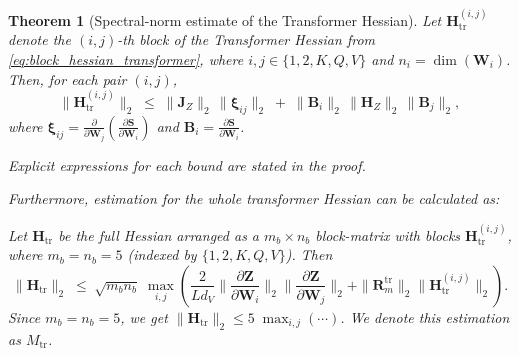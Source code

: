 \documentclass{article}
\newtheorem{theorem}{Theorem} %
\begin{document}
\begin{theorem}[Spectral-norm estimate of the Transformer Hessian]\label{thm:transformer_hessian_estimate}
Let $\mathbf{H}_{\mathrm{tr}}^{(i,j)}$ denote the $(i,j)$-th block of the Transformer Hessian from \eqref{eq:block_hessian_transformer}, where $i,j\in\{1,2,K,Q,V\}$ and $n_i=\dim(\mathbf{W}_i)$. Then, for each pair $(i,j)$,
\begin{equation}\label{eq:block_bound_transformer}
\big\|\mathbf{H}_{\mathrm{tr}}^{(i,j)}\big\|_2
\;\le\;
\|\mathbf{J}_Z\|_2 \,\|\boldsymbol{\xi}_{ij}\|_2
\;+\;
\|\mathbf{B}_i\|_2 \,\|\mathbf{H}_Z\|_2 \,\|\mathbf{B}_j\|_2,
\end{equation}
where $\boldsymbol{\xi}_{ij}=\frac{\partial}{\partial \mathbf{W}_j}\!\left(\frac{\partial \mathbf{S}}{\partial \mathbf{W}_i}\right)$ and $\mathbf{B}_i=\frac{\partial \mathbf{S}}{\partial \mathbf{W}_i}$. 

Explicit expressions for each bound are stated in the proof.

Furthermore, estimation for the whole transformer Hessian can be calculated as:

Let $\mathbf{H}_{\mathrm{tr}}$ be the full Hessian arranged as a $m_b \times n_b$ block-matrix with blocks $\mathbf{H}_{\mathrm{tr}}^{(i,j)}$, where $m_b=n_b=5$ (indexed by $\{1,2,K,Q,V\}$). Then
\begin{equation}\label{eq:full_bound_transformer}
\|\mathbf{H}_{\mathrm{tr}}\|_2
\;\le\;
\sqrt{m_b n_b}\; \max \limits_{i,j} \left(\frac{2}{L d_V}\|\frac{\partial \mathbf{Z}}{\partial \mathbf{W}_i}\|_2 \|\frac{\partial \mathbf{Z}}{\partial \mathbf{W}_j}\|_2 + \|\mathbf{R}^{\text{tr}}_m\|_2 \|\mathbf{H}_{\text{tr}}^{(i,j)}\|_2 \right).
\end{equation}
Since $m_b=n_b=5$, we get $\|\mathbf{H}_{\mathrm{tr}}\|_2 \le 5 \; \max_{i,j}(\cdots)$. We denote this estimation as $M_{\text{tr}}$.


\end{theorem}
\end{document}
